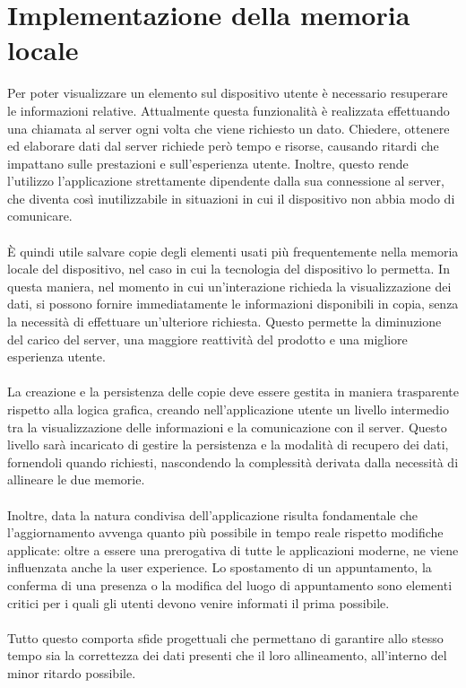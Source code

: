
\section{Implementazione della memoria locale}

Per poter visualizzare un elemento sul dispositivo utente
è necessario resuperare le informazioni relative.
Attualmente questa funzionalità è realizzata effettuando una chiamata al server
ogni volta che viene richiesto un dato.
Chiedere, ottenere ed elaborare dati dal server richiede però tempo e risorse,
causando ritardi che impattano sulle prestazioni e sull'esperienza utente.
Inoltre, questo rende l'utilizzo l'applicazione strettamente dipendente dalla sua connessione al server,
che diventa così inutilizzabile in situazioni in cui il dispositivo non abbia modo di comunicare.\\
\\
È quindi utile salvare copie degli elementi usati più frequentemente 
nella memoria locale del dispositivo,
nel caso in cui la tecnologia del dispositivo lo permetta.
In questa maniera, nel momento in cui un'interazione richieda la visualizzazione dei dati, 
si possono fornire immediatamente le informazioni disponibili in copia, 
senza la necessità di effettuare un'ulteriore richiesta.
Questo permette la diminuzione del carico del server, 
una maggiore reattività del prodotto e una migliore esperienza utente.\\
\\
La creazione e la persistenza delle copie deve essere gestita 
in maniera trasparente rispetto alla logica grafica, 
creando nell'applicazione utente un livello intermedio tra 
la visualizzazione delle informazioni e la comunicazione con il server.
Questo livello sarà incaricato di gestire la persistenza e la modalità di recupero dei dati,
fornendoli quando richiesti, 
nascondendo la complessità derivata dalla necessità di allineare le due memorie.\\
\\
Inoltre, data la natura condivisa dell'applicazione risulta fondamentale 
che l'aggiornamento avvenga quanto più possibile in tempo reale rispetto modifiche applicate:
oltre a essere una prerogativa di tutte le applicazioni moderne, 
ne viene influenzata anche la user experience. 
Lo spostamento di un appuntamento, 
la conferma di una presenza o la modifica del luogo di appuntamento 
sono elementi critici per i quali gli utenti devono venire informati il prima possibile. \\
\\
Tutto questo comporta sfide progettuali che permettano di garantire allo stesso tempo 
sia la correttezza dei dati presenti che il loro allineamento,
all'interno del minor ritardo possibile.
\clearpage
